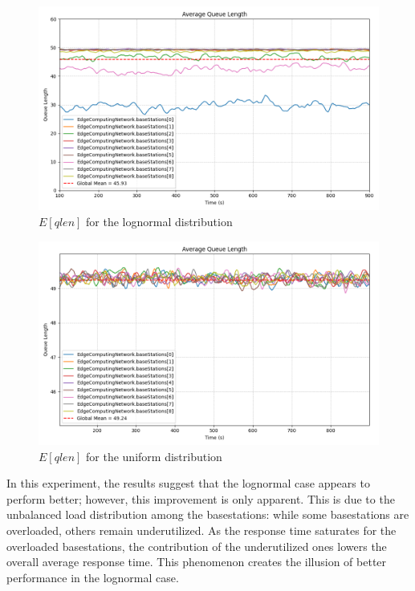 \documentclass{report}
\begin{document}
\begin{figure}[H]
    \centering
    \includegraphics[width=\textwidth]{img/plots/log_1e4_A/qlen.png}
    \caption{$E[qlen]$ for the lognormal distribution}
\end{figure}

\begin{figure}[H]
    \centering
    \includegraphics[width=\textwidth]{img/plots/uni_1e4_A/qlen.png}
    \caption{$E[qlen]$ for the uniform distribution}
\end{figure}

In this experiment, the results suggest that the lognormal case appears to perform better; however, this improvement is only apparent.
This is due to the unbalanced load distribution among the basestations: while some basestations are overloaded, others remain underutilized.
As the response time saturates for the overloaded basestations, the contribution of the underutilized ones lowers the overall average response time.
This phenomenon creates the illusion of better performance in the lognormal case.
\end{document}
